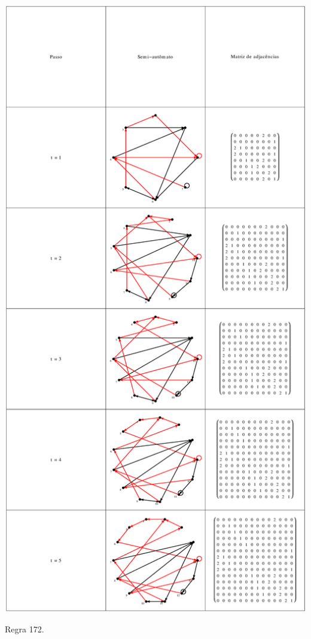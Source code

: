 \documentclass[12pt,a4paper]{article}
\begin{document}
\begin{table}[H]
\begin{center}
\includegraphics[scale=0.32]{img/mat/matr172.eps}
\caption{Regra 172.}
\label{tab:mr172}
\end{center}
\end{table}
\end{document}
